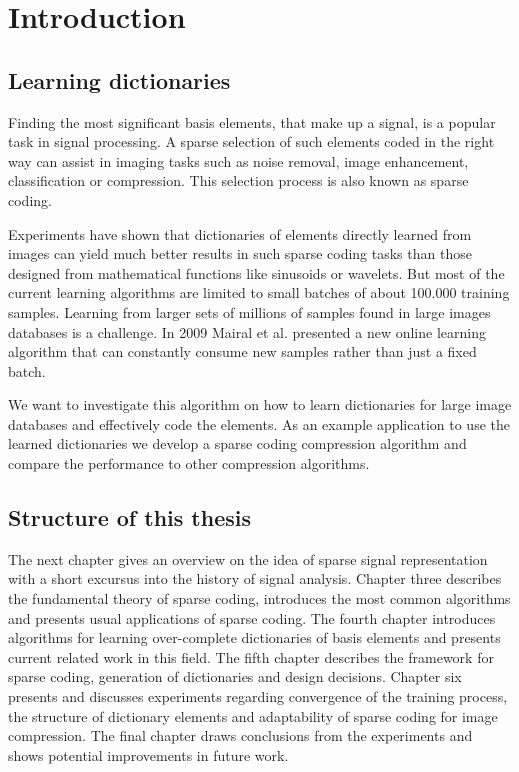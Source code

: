 \chapter{Introduction}
\label{sec:introduction}
\section{Learning dictionaries}

Finding the most significant basis elements, that make up a
signal, is a popular task in signal processing. A sparse selection of such
elements coded in the right way can assist in imaging tasks such as noise
removal, image enhancement, classification or compression. This selection
process is also known as sparse coding.

Experiments \cite{Chen1998,Elad2006} have shown that dictionaries of 
elements directly learned from images can yield much better results in
such sparse coding tasks than those designed from mathematical functions like
sinusoids or wavelets. But most of the current learning algorithms are limited
to small batches of about 100.000 training samples. Learning from
larger sets of millions of samples found in large images databases is a
challenge. In 2009 Mairal et al.\cite{Mairal2009} presented a new online
learning algorithm that can constantly consume new samples rather than just a
fixed batch. 

We want to investigate this algorithm on how to learn dictionaries
for large image databases and effectively code the elements. As an example
application to use the learned dictionaries we develop a sparse coding
compression algorithm and compare the performance to other compression
algorithms.

\section{Structure of this thesis}
The next chapter gives an overview on the idea of sparse signal
representation with a short excursus into the history of signal analysis.
Chapter three describes the fundamental theory of sparse coding, introduces the
most common algorithms and presents usual applications of sparse coding. The
fourth chapter introduces algorithms for learning over-complete
dictionaries of basis elements and presents current related work in this field.
The fifth chapter describes the framework for sparse coding, generation
of dictionaries and design decisions. Chapter six presents and discusses
experiments regarding convergence of the training process, the structure of
dictionary elements and adaptability of sparse coding for image compression. 
The final chapter draws conclusions from the experiments and shows potential
improvements in future work. 


